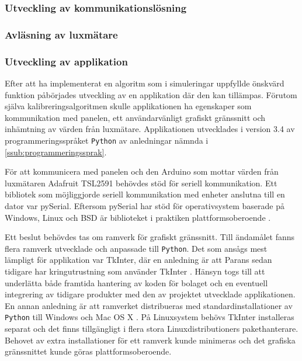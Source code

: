         \subsubsection{Utveckling av kommunikationslösning} %
        \label{ssub:utveckling_av_kommunikationslosning}

        \subsubsection{Avläsning av luxmätare} %
        \label{ssub:avlasning_av_luxmatare}

        \subsubsection{Utveckling av applikation} %
        \label{ssub:utveckling_av_applikation}
            Efter att ha implementerat en algoritm som i simuleringar uppfyllde önskvärd funktion påbörjades utveckling av en applikation där den kan tillämpas. Förutom själva kalibreringsalgoritmen skulle applikationen ha egenskaper som kommunikation med panelen, ett användarvänligt grafiskt gränssnitt och inhämtning av värden från luxmätare. Applikationen utvecklades i version 3.4 av programmeringsspråket \texttt{Python} av anledningar nämnda i \ref{ssub:programmeringssprak}. \bigskip

            För att kommunicera med panelen och den Arduino som mottar värden från luxmätaren Adafruit TSL2591 behövdes stöd för seriell kommunikation. Ett bibliotek som möjliggjorde seriell kommunikation med enheter anslutna till en dator var pySerial. Eftersom pySerial har stöd för operativsystem baserade på Windows, Linux och BSD är biblioteket i praktiken plattformsoberoende \cite{pyserial}. \bigskip

            Ett beslut behövdes tas om ramverk för grafiskt gränssnitt. Till ändamålet fanns flera ramverk utvecklade och anpassade till \texttt{Python}. Det som ansågs mest lämpligt för applikation var TkInter, där en anledning är att Parans sedan tidigare har kringutrustning som använder TkInter \cite{solarremote}. Hänsyn togs till att underlätta både framtida hantering av koden för bolaget och en eventuell integrering av tidigare produkter med den av projektet utvecklade applikationen. En annan anledning är att ramverket distribueras med standardinstallationer av \texttt{Python} till Windows och Mac OS X \cite{tkinter}. På Linuxsystem behövs TkInter installeras separat och det finns tillgängligt i flera stora Linuxdistributioners pakethanterare. Behovet av extra installationer för ett ramverk kunde minimeras och det grafiska gränssnittet kunde göras plattformsoberoende. \bigskip

